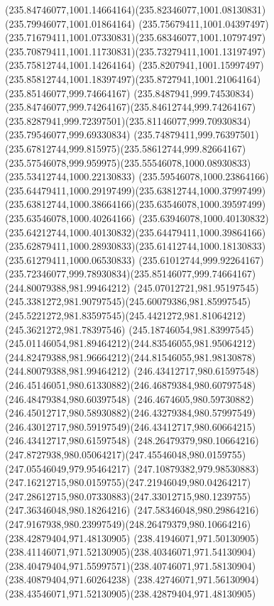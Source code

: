 {{		\curveto(235.84746077,1001.14664164)(235.82346077,1001.08130831)(235.79946077,1001.01864164)
		\curveto(235.75679411,1001.04397497)(235.71679411,1001.07330831)(235.68346077,1001.10797497)
		\curveto(235.70879411,1001.11730831)(235.73279411,1001.13197497)(235.75812744,1001.14264164)
		\curveto(235.8207941,1001.15997497)(235.85812744,1001.18397497)(235.8727941,1001.21064164)
		\moveto(235.85146077,999.74664167)
		\curveto(235.8487941,999.74530834)(235.84746077,999.74264167)(235.84612744,999.74264167)
		\curveto(235.8287941,999.72397501)(235.81146077,999.70930834)(235.79546077,999.69330834)
		\curveto(235.74879411,999.76397501)(235.67812744,999.815975)(235.58612744,999.82664167)
		\curveto(235.57546078,999.959975)(235.55546078,1000.08930833)(235.53412744,1000.22130833)
		\curveto(235.59546078,1000.23864166)(235.64479411,1000.29197499)(235.63812744,1000.37997499)
		\curveto(235.63812744,1000.38664166)(235.63546078,1000.39597499)(235.63546078,1000.40264166)
		\curveto(235.63946078,1000.40130832)(235.64212744,1000.40130832)(235.64479411,1000.39864166)
		\curveto(235.62879411,1000.28930833)(235.61412744,1000.18130833)(235.61279411,1000.06530833)
		\curveto(235.61012744,999.92264167)(235.72346077,999.78930834)(235.85146077,999.74664167)
		\moveto(244.80079388,981.99464212)
		\curveto(245.07012721,981.95197545)(245.3381272,981.90797545)(245.60079386,981.85997545)
		\curveto(245.5221272,981.83597545)(245.4421272,981.81064212)(245.3621272,981.78397546)
		\curveto(245.18746054,981.83997545)(245.01146054,981.89464212)(244.83546055,981.95064212)
		\curveto(244.82479388,981.96664212)(244.81546055,981.98130878)(244.80079388,981.99464212)
		\moveto(246.43412717,980.61597548)
		\curveto(246.45146051,980.61330882)(246.46879384,980.60797548)(246.48479384,980.60397548)
		\curveto(246.4674605,980.59730882)(246.45012717,980.58930882)(246.43279384,980.57997549)
		\curveto(246.43012717,980.59197549)(246.43412717,980.60664215)(246.43412717,980.61597548)
		\moveto(248.26479379,980.10664216)
		\curveto(247.8727938,980.05064217)(247.45546048,980.0159755)(247.05546049,979.95464217)
		\curveto(247.10879382,979.98530883)(247.16212715,980.0159755)(247.21946049,980.04264217)
		\curveto(247.28612715,980.07330883)(247.33012715,980.1239755)(247.36346048,980.18264216)
		\curveto(247.58346048,980.29864216)(247.9167938,980.23997549)(248.26479379,980.10664216)
		\moveto(238.42879404,971.48130905)
		\curveto(238.41946071,971.50130905)(238.41146071,971.52130905)(238.40346071,971.54130904)
		\curveto(238.40479404,971.55997571)(238.40746071,971.58130904)(238.40879404,971.60264238)
		\curveto(238.42746071,971.56130904)(238.43546071,971.52130905)(238.42879404,971.48130905)
}}
